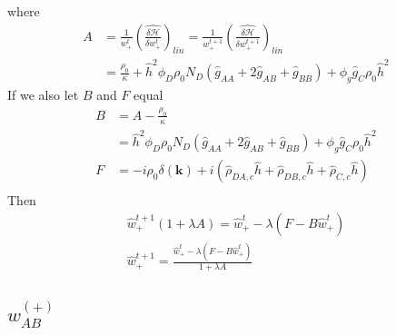 \documentclass{article}
\begin{document}
  where
  \begin{align*}
    A &=
    \frac{1}{w_+^t}
    \left( \hat{\frac{\delta \mathcal{H}}{\delta w_+^t}} \right) _{lin}
    =
    \frac{1}{w_+^{t+1}}
    \left( \hat{\frac{\delta \mathcal{H}}{\delta w_+^{t+1}}} \right) _{lin} \\
    &=
    \frac{\rho_0}{\kappa}
        + \hat{h}^2 \phi_D \rho_0 N_D
          (\hat{g}_{AA} + 2 \hat{g}_{AB} + \hat{g}_{BB})
       + \phi_g \hat{g}_{C} \rho_0 \hat{h}^2
  \end{align*}
  If we also let $B$ and $F$ equal
  \begin{align*}
    B &= A - \frac{\rho_0}{\kappa} \\
      &= \hat{h}^2 \phi_D \rho_0 N_D
          (\hat{g}_{AA} + 2 \hat{g}_{AB} + \hat{g}_{BB})
       + \phi_g \hat{g}_{C} \rho_0 \hat{h}^2 \\ 
    F &= - i \rho_0 \delta (\mathbf{k})
         + i ( \hat{\rho}_{DA,c} \hat{h}
              + \hat{\rho}_{DB,c} \hat{h}
              + \hat{\rho}_{C,c}  \hat{h} ) \\
  \end{align*}
  Then
  \begin{align*}
    \hat{w}_+^{t+1} ( 1 + \lambda A ) =
    \hat{w}_+^t - \lambda \left( F - B \hat{w}_+^t \right) \\
    \hat{w}_+^{t+1} =
    \frac{\hat{w}_+^t - \lambda \left( F - B \hat{w}_+^t \right)}
         {1 + \lambda A}
  \end{align*}
  
  \subsection{$w_{AB}^{(+)}$}
\end{document}
